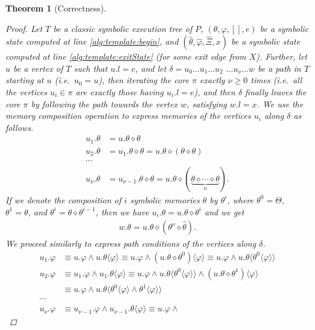 \documentclass{sig-alternate}%
\newtheorem{thm}{Theorem}%
\newcommand{\ese}[1]{\ensuremath{\langle #1 \rangle}}
\newcommand{\compose}{\ensuremath{\diamond}}
\begin{document}
\begin{thm}[Correctness]
\begin{proof}
Let $T$ be a classic symbolic execution tree of $P$, $(\theta, \varphi,
[], e)$ be a symbolic state computed at line \ref{alg:template:begin},
and $(\hat{\theta}, \hat{\varphi}, \hat{\Xi}, x)$ be a symbolic state
computed at line \ref{alg:template:exitState} (for some exit edge from
$X$). Further, let $u$ be a vertex of $T$ such that $u.l = e$, and let
$\delta = u_0 \ldots u_1 \ldots u_2$ $\ldots u_{\nu} \ldots w$ be a path
in $T$ starting at $u$ (i.e.~$u_0 = u$), then iterating the core $\pi$
exactly $\nu \geq 0$ times (i.e.~all the vertices $u_i \in \pi$ are
exactly those having $u_i.l = e$), and then $\delta$ finally leaves
the core $\pi$ by following the path towards the vertex $w$,
satisfying $w.l = x$. We use the memory composition operation to
express memories of the vertices $u_i$ along $\delta$ as follows.
\begin{align*}
u_1.\theta &= u.\theta \compose \theta
\\
u_2.\theta &= u_1.\theta \compose \theta = u.\theta \compose (\theta \compose
\theta)
\\
\cdots
\\
u_{\nu}.\theta &= u_{\nu-1}.\theta \compose \theta = u.\theta \compose
(\underset{\nu}{\underbrace{\theta \compose \cdots \compose \theta}}).
\end{align*}
If we denote the composition of $i$ symbolic memories $\theta$ by
$\theta^i$, where $\theta^0 = \Theta$, $\theta^1 = \theta$, and
$\theta^i = \theta \compose \theta^{i-1}$, then we have $u_{i}.\theta =
u.\theta \compose \theta^i$ and we get
\begin{align*}
w.\theta = u.\theta \compose (\theta^{\nu} \compose \hat{\theta}).
\end{align*}
We proceed similarly to express path conditions of the vertices along
$\delta$.
\begin{align*}
u_1.\varphi &\equiv u.\varphi \wedge u.\theta\ese{\varphi} \equiv
u.\varphi \wedge (u.\theta \compose \theta^0)\ese{\varphi} \equiv
u.\varphi \wedge u.\theta\ese{\theta^0\ese{\varphi}}
\\
u_2.\varphi &\equiv u_1.\varphi \wedge u_1.\theta\ese{\varphi} \equiv
u.\varphi \wedge u.\theta\ese{\theta^0\ese{\varphi}} \wedge (u.\theta
\compose \theta^1)\ese{\varphi} \\ &\equiv u.\varphi \wedge
u.\theta\ese{\theta^0\ese{\varphi} \wedge \theta^1\ese{\varphi}}
\\
\cdots
\\
u_{\nu}.\varphi &\equiv u_{\nu-1}.\varphi \wedge
u_{\nu-1}.\theta\ese{\varphi} \equiv u.\varphi \wedge

\end{align*}
\end{proof}
\end{thm}
\end{document}
